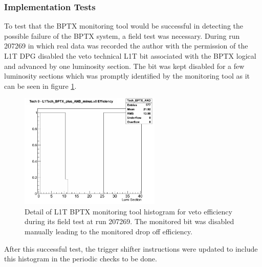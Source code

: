 \subsubsection{Implementation Tests}


To test that the \gls{BPTX} monitoring tool would be successful in detecting the possible failure of the \gls{BPTX} system, a field test was necessary. During run 207269 in which real data was recorded the author with the permission of the \gls{L1T} \gls{DPG} disabled the veto technical \gls{L1T} bit associated with the \gls{BPTX} logical and advanced by one luminosity section. The bit was kept disabled for a few luminosity sections which was promptly identified by the monitoring tool as it can be seen in figure \ref{FIGURE:TechnicalWork_L1TBPTX_ImplementationTests}.

\begin{figure}[!htb]
\centering
\includegraphics[width=0.60\textwidth]{Chapter03/L1TOnline/Images/L1TBPTX_Tech_BPTX_AND.png}
\caption{Detail of \gls{L1T} \gls{BPTX} monitoring tool histogram for veto efficiency during its field test at run 207269. The monitored bit was disabled manually leading to the monitored drop off efficiency.} 
\label{FIGURE:TechnicalWork_L1TBPTX_ImplementationTests}
\end{figure}

After this successful test, the trigger shifter instructions were updated to include this histogram in the periodic checks to be done.  

